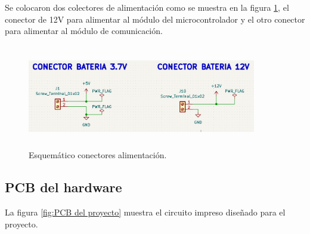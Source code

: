 Se colocaron dos colectores de alimentación como se muestra en la figura \ref{fig:esquematico conectores alimentacion}, el conector de 12V para alimentar al módulo del microcontrolador y el otro conector para alimentar al módulo de comunicación.
\begin{figure}[h]
  \centering
	\includegraphics[width=10cm, height=4.5cm]{./Figures/esquematico_alimentacion.png}
	\caption{Esquemático conectores alimentación.}
	\label{fig:esquematico conectores alimentacion}
\end{figure}

\subsection{PCB del hardware} 
La figura \ref{fig:PCB del proyecto} muestra el circuito impreso diseñado para el proyecto.

